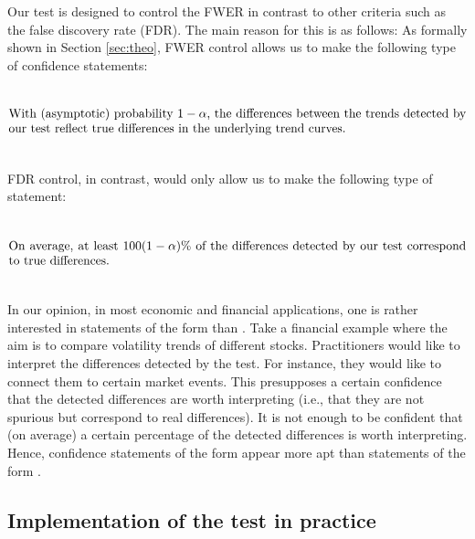 \documentclass[12pt]{article}
\makeatletter
\renewcommand{\eqref}[1]{\tagform@{\ref{#1}}}
\makeatother
\begin{document}
\begin{remark} 
Our test is designed to control the FWER in contrast to other criteria such as the false discovery rate (FDR). The main reason for this is as follows: As formally shown in Section \ref{sec:theo},  FWER control allows us to make the following type of confidence statements:
\begin{equation}\label{eq:CS-FWER}
\begin{minipage}[c][2.25cm][c]{13cm}
With (asymptotic) probability $1-\alpha$, the differences between the trends detected by our test reflect true differences in the underlying trend curves.
\end{minipage}
\end{equation}
FDR control, in contrast, would only allow us to make the following type of statement:
\begin{equation}\label{eq:CS-FDR}
\begin{minipage}[c][2.25cm][c]{13cm}
On average, at least $100 (1-\alpha) \%$ of the differences detected by our test correspond to true differences.
\end{minipage}
\end{equation}
In our opinion, in most economic and financial applications, one is rather interested in statements of the form \eqref{eq:CS-FWER} than \eqref{eq:CS-FDR}. Take a financial example where the aim is to compare volatility trends of different stocks. Practitioners would like to interpret the differences detected by the test. For instance, they would like to connect them to certain market events. This presupposes a certain confidence that the detected differences are worth interpreting (i.e., that they are not spurious but correspond to real differences). It is not enough to be confident that (on average) a certain percentage of the detected differences is worth interpreting. Hence, confidence statements of the form \eqref{eq:CS-FWER} appear more apt than statements of the form \eqref{eq:CS-FDR}.
\end{remark}
  

\subsection{Implementation of the test in practice}\label{subsec:test:impl}
\end{document}
